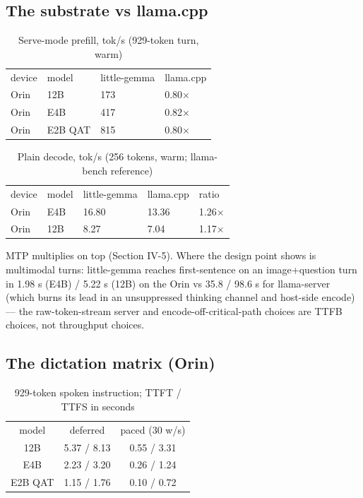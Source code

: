 \documentclass[journal]{IEEEtran}
\begin{document}
\subsection{The substrate vs llama.cpp}

\begin{table}[H]
    \begin{tabularx}{\columnwidth}{l X X X}
        device & model  & little-gemma  & llama.cpp \\
        Orin & 12B & 173 & 0.80×\\
        Orin & E4B & 417 & 0.82×\\
        Orin & E2B QAT & 815 & 0.80×\\
    \end{tabularx}
    \caption{Serve-mode prefill, tok/s (929-token turn, warm)}
    \label{tab:serve-mode-prefill}
\end{table}


\begin{table}[H]
    \begin{tabularx}{\columnwidth}{l X X X X}
        device & model  & little-gemma  & llama.cpp & ratio\\
         Orin & E4B & 16.80 & 13.36 & 1.26×\\
         Orin & 12B & 8.27 & 7.04 & 1.17×\\
    \end{tabularx}
    \caption{Plain decode, tok/s (256 tokens, warm; llama-bench reference)}
    \label{tab:plain-decode}
\end{table}

MTP multiplies on top (Section IV-5). Where the design point shows is multimodal turns: little-gemma reaches first-sentence on an image+question turn in 1.98 s (E4B) / 5.22 s (12B) on the Orin vs 35.8 / 98.6 s for llama-server (which burns its lead in an unsuppressed thinking channel and host-side encode) — the raw-token-stream server and encode-off-critical-path choices are TTFB choices, not throughput choices.

\subsection{The dictation matrix (Orin)}


\begin{table}[H]
    \begin{tabular}{ccc}
        model & deferred & paced (30 w/s) \\
        12B & 5.37 / 8.13 & 0.55 / 3.31 \\
        E4B & 2.23 / 3.20 & 0.26 / 1.24 \\
        E2B QAT & 1.15 / 1.76 & 0.10 / 0.72\\
    \end{tabular}
    \caption{929-token spoken instruction; TTFT / TTFS in seconds}
    \label{tab:929-token}
\end{table}
\end{document}
